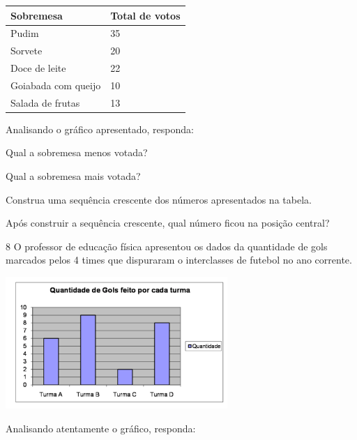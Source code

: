 \begin{longtable}[]{@{}ll@{}}
\toprule
Sobremesa & Total de votos\tabularnewline
\midrule
\endhead
Pudim & 35\tabularnewline
Sorvete & 20\tabularnewline
Doce de leite & 22\tabularnewline
Goiabada com queijo & 10\tabularnewline
Salada de frutas & 13\tabularnewline
\bottomrule
\end{longtable}

Analisando o gráfico apresentado, responda:

\begin{escolha}
\item Qual a sobremesa menos votada?


\item Qual a sobremesa mais votada?


\item Construa uma sequência crescente dos números apresentados na tabela.


\item Após construir a sequência crescente, qual número ficou na posição central?

\end{escolha}

\num{8} O professor de educação física apresentou os dados da quantidade de gols
marcados pelos 4 times que dispuraram o interclasses de futebol no ano
corrente.


\includegraphics[width=3.30769in,height=1.97201in]{./media/image97.png}

Analisando atentamente o gráfico, responda:

